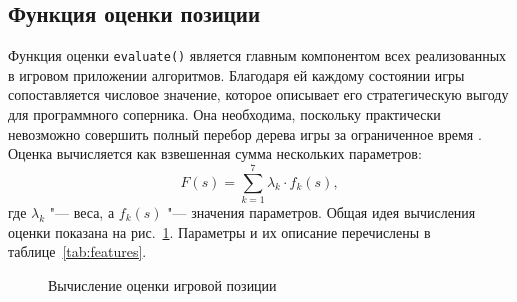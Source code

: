 \documentclass[a4paper,12pt]{diplom}
\begin{document}
\subsection*{Функция оценки позиции}

Функция оценки \texttt{evaluate()} является главным компонентом всех реализованных в игровом приложении алгоритмов. Благодаря ей каждому состоянии игры сопоставляется числовое значение, которое описывает его стратегическую выгоду для программного соперника. Она необходима, поскольку практически невозможно совершить полный перебор дерева игры за ограниченное время \cite{Pearl:1984}. Оценка вычисляется как взвешенная сумма нескольких параметров:
\begin{equation}
    F(s) = \sum_{k=1}^{7} \lambda_k \cdot f_k(s),
\end{equation}
где $\lambda_k$ "--- веса, а $f_k(s)$ "--- значения параметров. Общая идея вычисления оценки показана на рис.~\ref{fig:evaluation_scheme}. Параметры и их описание перечислены в таблице~\ref{tab:features}.

\begin{figure}[h]
    \centering
    \caption{Вычисление оценки игровой позиции}
    \label{fig:evaluation_scheme}
\end{figure}
\end{document}
